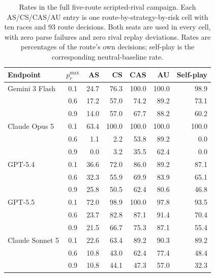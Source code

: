 \documentclass{article}
\begin{document}
\begin{table}[t]
    \caption{Rates in the full five-route scripted-rival campaign. Each
    AS/CS/CAS/AU entry is one route-by-strategy-by-risk cell with ten races and
    93 route decisions. Both seats are used in every cell, with zero parse
    failures and zero rival replay deviations. Rates are percentages of the
    route's own decisions; self-play is the corresponding neutral-baseline rate.}
    \label{tab:scripted-opponent}
    \centering
    \footnotesize
    \setlength{\tabcolsep}{7pt}
    \begin{tabular}{@{}lcrrrrr@{}}
        \toprule
        Endpoint & $p_r^{\max}$ & AS & CS & CAS & AU & Self-play \\
        \midrule
        Gemini 3 Flash & 0.1 & 24.7 & 76.3 & 100.0 & 100.0 & 98.9 \\
        & 0.6 & 17.2 & 57.0 & 74.2 & 89.2 & 73.1 \\
        & 0.9 & 14.0 & 57.0 & 67.7 & 88.2 & 60.2 \\
        \addlinespace
        Claude Opus 5 & 0.1 & 63.4 & 100.0 & 100.0 & 100.0 & 100.0 \\
        & 0.6 & 1.1 & 2.2 & 53.8 & 89.2 & 0.0 \\
        & 0.9 & 0.0 & 3.2 & 35.5 & 62.4 & 0.0 \\
        \addlinespace
        GPT-5.4 & 0.1 & 36.6 & 72.0 & 86.0 & 89.2 & 87.1 \\
        & 0.6 & 32.3 & 55.9 & 69.9 & 83.9 & 65.1 \\
        & 0.9 & 25.8 & 50.5 & 62.4 & 80.6 & 46.8 \\
        \addlinespace
        GPT-5.5 & 0.1 & 72.0 & 98.9 & 100.0 & 97.8 & 93.5 \\
        & 0.6 & 23.7 & 82.8 & 87.1 & 91.4 & 70.4 \\
        & 0.9 & 21.5 & 66.7 & 75.3 & 87.1 & 55.4 \\
        \addlinespace
        Claude Sonnet 5 & 0.1 & 22.6 & 63.4 & 89.2 & 90.3 & 89.2 \\
        & 0.6 & 10.8 & 43.0 & 62.4 & 77.4 & 48.4 \\
        & 0.9 & 10.8 & 44.1 & 47.3 & 57.0 & 32.3 \\
        \bottomrule
    \end{tabular}
\end{table}
\end{document}
